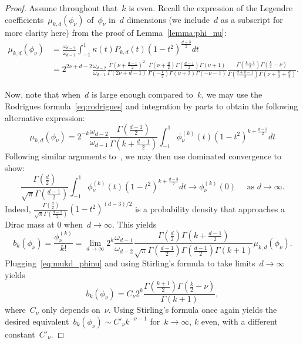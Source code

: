 \begin{proof}
Assume throughout that~$k$ is even.
Recall the expression of the Legendre coefficients~$\mu_{k,d}(\phi_\nu)$ of~$\phi_\nu$ in~$d$ dimensions (we include~$d$ as a subscript for more clarity here) from the proof of Lemma~\ref{lemma:phi_nu}:
\begin{align}
\mu_{k,d}(\phi_\nu) &= \frac{\omega_{d-2}}{\omega_{d-1}} \int_{-1}^1 \kappa(t) P_{k,d}(t) (1 - t^2)^{\frac{d-3}{2}} dt \\
	&= 2^{2 \nu + d - 2} \frac{\omega_{d-2}}{\omega_{d-1}} \frac{\Gamma(\nu + \frac{d-1}{2})^2}{\Gamma(2 \nu + d - 1)} \frac{\Gamma(\nu + \frac{d}{2}) \Gamma(\frac{d-1}{2}) \Gamma(\nu + 1)}{\Gamma(-\frac{1}{2}) \Gamma(\nu + 2) \Gamma(-\nu - 1)} \frac{\Gamma(\frac{k + 1}{2}) \Gamma(\frac{k}{2} - \nu) }{\Gamma(\frac{d+k-1}{2}) \Gamma(\nu + \frac{k}{2} + \frac{d}{2})}. \label{eq:mukd_phinu}
\end{align}

Now, note that when~$d$ is large enough compared to~$k$, we may use the Rodrigues formula~\eqref{eq:rodrigues} and integration by parts to obtain the following alternative expression:
\begin{equation*}
\mu_{k,d}(\phi_\nu) = 2^{-k} \frac{\omega_{d-2}}{\omega_{d-1}}  \frac{\Gamma(\frac{d-1}{2})}{\Gamma(k + \frac{d-1}{2})} \int_{-1}^1 \phi_\nu^{(k)}(t) (1 - t^2)^{k + \frac{d-3}{2}} dt
\end{equation*}
Following similar arguments to~\citet{ghorbani2019linearized}, we may then use dominated convergence to show:
\begin{equation*}
\frac{\Gamma(\frac{d}{2})}{\sqrt{\pi}\Gamma(\frac{d-1}{2})} \int_{-1}^1 \phi_\nu^{(k)}(t) (1 - t^2)^{k + \frac{d-3}{2}} dt \to \phi_\nu^{(k)}(0) \quad \text{ as }d \to \infty.
\end{equation*}
Indeed, $\frac{\Gamma(\frac{d}{2})}{\sqrt{\pi}\Gamma(\frac{d-1}{2})} (1 - t^2)^{(d-3)/2}$ is a probability density that approaches a Dirac mass at 0 when~$d \to \infty$.
This yields
\begin{equation*}
b_k(\phi_\nu) = \frac{\phi_\nu^{(k)}}{k!} = \lim_{d \to \infty} 2^{k} \frac{\omega_{d-1}}{\omega_{d-2}} \frac{\Gamma(\frac{d}{2})\Gamma(k + \frac{d-1}{2})}{\sqrt{\pi}\Gamma(\frac{d-1}{2}) \Gamma(\frac{d-1}{2}) \Gamma(k + 1)} \mu_{k,d}(\phi_\nu).
\end{equation*}
Plugging~\eqref{eq:mukd_phinu} and using Stirling's formula to take limits~$d \to \infty$ yields
\begin{equation*}
b_k(\phi_\nu) = C_\nu 2^k \frac{\Gamma(\frac{k + 1}{2}) \Gamma(\frac{k}{2} - \nu) }{\Gamma(k+1)},
\end{equation*}
where~$C_\nu$ only depends on~$\nu$. Using Stirling's formula once again yields the desired equivalent~$b_k(\phi_\nu) \sim C'_\nu k^{- \nu - 1}$ for~$k \to \infty$, $k$ even, with a different constant~$C'_\nu$.
\end{proof}

